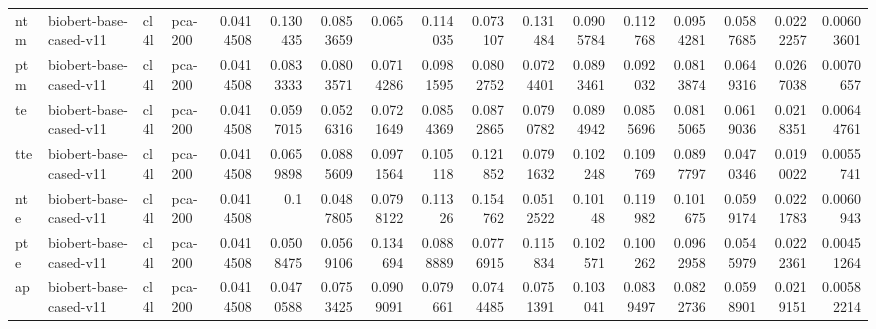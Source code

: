 \begin{tabular}{llllrrrrrrrrrrrrr}
 ntm         & biobert-base-cased-v11 & cl4l             & pca-200               &        0.0414508 &        0.130435  &        0.0853659 &        0.065     &        0.114035  &        0.073107  &        0.131484  &        0.0905784 &        0.112768  &        0.0954281 &         0.0587685 &         0.0222257 &        0.00603601 \\
 ptm         & biobert-base-cased-v11 & cl4l             & pca-200               &        0.0414508 &        0.0833333 &        0.0803571 &        0.0714286 &        0.0981595 &        0.0802752 &        0.0724401 &        0.0893461 &        0.092032  &        0.0813874 &         0.0649316 &         0.0267038 &        0.0070657  \\
 te          & biobert-base-cased-v11 & cl4l             & pca-200               &        0.0414508 &        0.0597015 &        0.0526316 &        0.0721649 &        0.0854369 &        0.0872865 &        0.0790782 &        0.0894942 &        0.0855696 &        0.0815065 &         0.0619036 &         0.0218351 &        0.00644761 \\
 tte         & biobert-base-cased-v11 & cl4l             & pca-200               &        0.0414508 &        0.0659898 &        0.0885609 &        0.0971564 &        0.105118  &        0.121852  &        0.0791632 &        0.102248  &        0.109769  &        0.0897797 &         0.0470346 &         0.0190022 &        0.0055741  \\
 nte         & biobert-base-cased-v11 & cl4l             & pca-200               &        0.0414508 &        0.1       &        0.0487805 &        0.0798122 &        0.11326   &        0.154762  &        0.0512522 &        0.10148   &        0.119982  &        0.101675  &         0.0599174 &         0.0221783 &        0.0060943  \\
 pte         & biobert-base-cased-v11 & cl4l             & pca-200               &        0.0414508 &        0.0508475 &        0.0569106 &        0.134694  &        0.0888889 &        0.0776915 &        0.115834  &        0.102571  &        0.100262  &        0.0962958 &         0.0545979 &         0.0222361 &        0.00451264 \\
 ap          & biobert-base-cased-v11 & cl4l             & pca-200               &        0.0414508 &        0.0470588 &        0.0753425 &        0.0909091 &        0.079661  &        0.0744485 &        0.0751391 &        0.103041  &        0.0839497 &        0.0822736 &         0.0598901 &         0.0219151 &        0.00582214 \\

\end{tabular}
